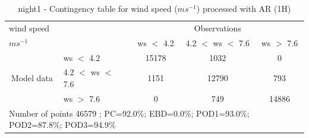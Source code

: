 \begin{table}[h!]
\begin{center}
\begin{tabular}{llccc}
\hline
{wind speed}                                       &                                                    & \multicolumn{3}{c}{Observations}                 \\
{$m s^{-1}$}                                       &                             & ws $<$ 4.2   & 4.2 $<$ ws $<$ 7.6 & ws $>$ 7.6 \\
\hline
\multicolumn{1}{c}{\multirow{3}{*}{Model data}}  & ws $<$ 4.2             & 15178                & 1032                       & 0              \\
                                                 & 4.2  $<$ ws $<$ 7.6 & 1151                & 12790                       & 793              \\
                                                 & ws $>$ 7.6             & 0                & 749                       & 14886              \\
\hline 
\multicolumn{5}{l}{ Number of points        46579 ; PC=92.0\%; EBD=0.0\%; POD1=93.0\%; POD2=87.8\%; POD3=94.9\%}                 \\
\end{tabular}
\end{center}
\caption{night1 - Contingency table for  wind speed ($m s^{-1}$) processed with AR (1H)}
\label{tab:contingencywsAFT:night1}
\end{table}
